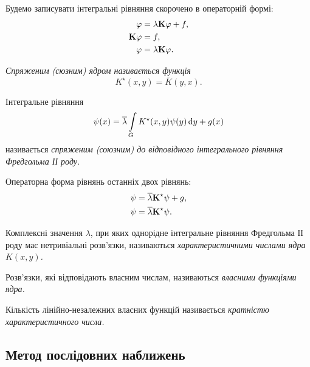 Будемо записувати інтегральні рівняння скорочено в операторній формі:
\begin{align}
	\phi &= \lambda \bf{K} \phi + f, \\
	\bf{K} \phi &= f, \\
	\phi &= \lambda \bf{K} \phi.
\end{align}

\begin{definition}
	\it{Спряженим (сюзним) ядром} називається функція
	\begin{equation}
		K^\star (x, y) = \overline{K}(y, x).
	\end{equation}
\end{definition}

\begin{definition}
	Інтегральне рівняння
	\begin{equation}
		\psi(x) = \overline \lambda \Int_G K^\star (x, y) \psi(y) \diff y + g(x)
	\end{equation}
	називається \it{спряженим (союзним)} до відповідного інтегрального рівняння Фредгольма ІІ роду.
\end{definition}

Операторна форма рівнянь останніх двох рівнянь:
\begin{align}
	\psi &= \overline \lambda \bf{K}^\star \psi + g, \\
	\psi &= \overline \lambda \bf{K}^\star \psi.
\end{align}

\begin{definition}
	Комплексні значення $\lambda$, при яких однорідне інтегральне рівняння Фредгольма ІІ роду має нетривіальні розв'язки, називаються \it{характеристичними числами ядра} $K(x, y)$.
\end{definition}

\begin{definition}
	Розв'язки, які відповідають власним числам, називаються \it{власними функціями} ядра.
\end{definition}

\begin{definition}
	Кількість лі\-ній\-но-незалежних власних функцій називається \it{кратністю характеристичного числа}.
\end{definition}

\subsection{Метод послідовних наближень}

